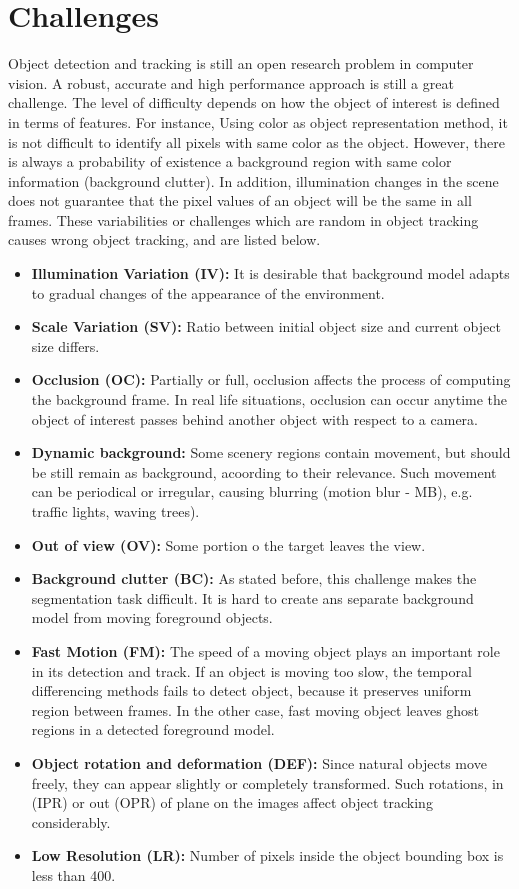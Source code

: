 \section{Challenges}

Object detection and tracking is still an open research problem in computer vision. A robust, accurate and high performance approach is still a great challenge. The level of difficulty depends on how the object of interest is defined in terms of features. For instance, Using color as object representation method, it is not difficult to identify all pixels with same color as the object. However, there is always a probability of existence a background region with same color information (background clutter). In addition, illumination changes in the scene does not guarantee that the pixel values of an object will be the same in all frames. These variabilities or challenges which are random in object tracking causes wrong object tracking, and are listed below.

\begin{itemize}
\item \textbf{Illumination Variation (IV):} It is desirable that background model adapts to gradual changes of the appearance of the environment.
\item \textbf{Scale Variation (SV):} Ratio between initial object size and current object size differs.
\item \textbf{Occlusion (OC):} Partially or full, occlusion affects the process of computing the background frame. In real life situations, occlusion can occur anytime the object of interest passes behind another object with respect to a camera.
\item \textbf{Dynamic background:} Some scenery regions contain movement, but should be still remain as background, acoording to their relevance. Such movement can be periodical or irregular, causing blurring (motion blur - MB), e.g. traffic lights, waving trees).
\item \textbf{Out of view (OV): } Some portion o the target leaves the view.
\item \textbf{Background clutter (BC):} As stated before, this challenge makes the segmentation task difficult. It is hard to create ans separate background model from moving foreground objects.
\item \textbf{Fast Motion (FM):} The speed of a moving object plays an important role in its detection and track. If an object is moving too slow, the temporal differencing methods fails to detect object, because it preserves uniform region between frames. In the other case, fast moving object leaves ghost regions in a detected foreground model.
\item \textbf{Object rotation and deformation (DEF):} Since natural objects move freely, they can appear slightly or completely transformed. Such rotations, in (IPR) or out (OPR) of plane on the images affect object tracking considerably.
\item \textbf{Low Resolution (LR):} Number of pixels inside the object bounding box is less than 400.
\end{itemize}

